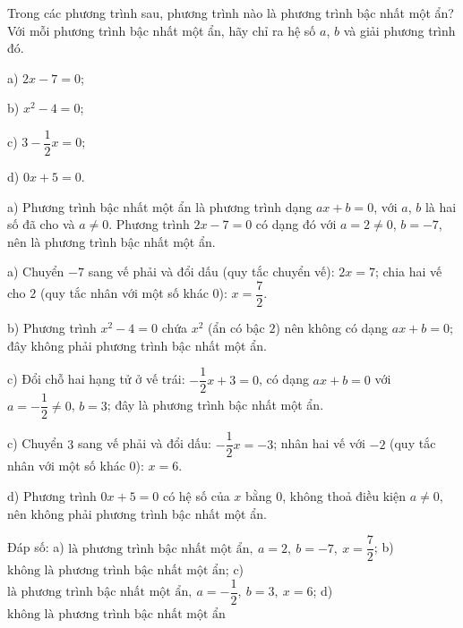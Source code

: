 \begin{problem}[8DS-PT1-011]
Trong các phương trình sau, phương trình nào là phương trình bậc nhất một ẩn? Với mỗi phương trình bậc nhất một ẩn, hãy chỉ ra hệ số $a$, $b$ và giải phương trình đó.

a) $2x - 7 = 0$;

b) $x^2 - 4 = 0$;

c) $3 - \dfrac{1}{2}x = 0$;

d) $0x + 5 = 0$.

\begin{solution}
a) Phương trình bậc nhất một ẩn là phương trình dạng $ax + b = 0$, với $a$, $b$ là hai số đã cho và $a \neq 0$. Phương trình $2x - 7 = 0$ có dạng đó với $a = 2 \neq 0$, $b = -7$, nên là phương trình bậc nhất một ẩn.

a) Chuyển $-7$ sang vế phải và đổi dấu (quy tắc chuyển vế): $2x = 7$; chia hai vế cho $2$ (quy tắc nhân với một số khác $0$): $x = \dfrac{7}{2}$.

b) Phương trình $x^2 - 4 = 0$ chứa $x^2$ (ẩn có bậc $2$) nên không có dạng $ax + b = 0$; đây không phải phương trình bậc nhất một ẩn.

c) Đổi chỗ hai hạng tử ở vế trái: $-\dfrac{1}{2}x + 3 = 0$, có dạng $ax + b = 0$ với $a = -\dfrac{1}{2} \neq 0$, $b = 3$; đây là phương trình bậc nhất một ẩn.

c) Chuyển $3$ sang vế phải và đổi dấu: $-\dfrac{1}{2}x = -3$; nhân hai vế với $-2$ (quy tắc nhân với một số khác $0$): $x = 6$.

d) Phương trình $0x + 5 = 0$ có hệ số của $x$ bằng $0$, không thoả điều kiện $a \neq 0$, nên không phải phương trình bậc nhất một ẩn.

Đáp số: a) $\boxed{\text{là phương trình bậc nhất một ẩn},\ a = 2,\ b = -7,\ x = \dfrac{7}{2}}$; b) $\boxed{\text{không là phương trình bậc nhất một ẩn}}$; c) $\boxed{\text{là phương trình bậc nhất một ẩn},\ a = -\dfrac{1}{2},\ b = 3,\ x = 6}$; d) $\boxed{\text{không là phương trình bậc nhất một ẩn}}$
\end{solution}
\end{problem}


